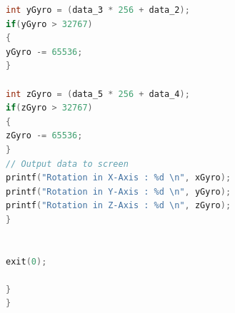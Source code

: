 \documentclass[UKenglish,10pt,a4paper]{report}
\let\openright=\clearpage
\begin{document}
\begin{lstlisting}[language=C]
int yGyro = (data_3 * 256 + data_2);
if(yGyro > 32767)
{
yGyro -= 65536;
}

int zGyro = (data_5 * 256 + data_4);
if(zGyro > 32767)
{
zGyro -= 65536;
}
// Output data to screen
printf("Rotation in X-Axis : %d \n", xGyro);
printf("Rotation in Y-Axis : %d \n", yGyro);
printf("Rotation in Z-Axis : %d \n", zGyro);
}


exit(0);

}
}
\end{lstlisting} 
\renewcommand{\acronymname}{List of acronyms}
\printglossaries



% 
\printbibliography
\openright
\end{document}
